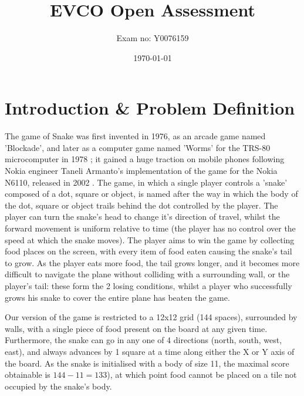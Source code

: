 \documentclass[british,10pt,a4paper]{article}
\begin{document}
\title{EVCO Open Assessment}
\author{Exam no: Y0076159}
\date{\today}
\maketitle
\tableofcontents
\clearpage
\listoffigures
\listoftables
\clearpage


\section{Introduction \& Problem Definition}

\begin{minipage}{0.7\textwidth}
The game of Snake was first invented in 1976, as an arcade game named 'Blockade', and later as a computer game named 'Worms' for the TRS-80 microcomputer in 1978 \cite{Goggin2010-ao}; it gained a huge traction on mobile phones following Nokia engineer Taneli Armanto's implementation of the game for the Nokia N6110, released in 2002 \cite{Goggin2010-ao}. The game, in which a single player controls a 'snake' composed of a dot, square or object, is named after the way in which the body of the dot, square or object trails behind the dot controlled by the player. The player can turn the snake's head to change it's direction of travel, whilst the forward movement is uniform relative to time (the player has no control over the speed at which the snake moves). The player aims to win the game by collecting food places on the screen, with every item of food eaten causing the snake's tail to grow. As the player eats more food, the tail grows longer, and it becomes more difficult to navigate the plane without colliding with a surrounding wall, or the player's tail: these form the 2 losing conditions, whilst a player who successfully grows his snake to cover the entire plane has beaten the game.  \newline

Our version of the game is restricted to a 12x12 grid (144 spaces), surrounded by walls, with a single piece of food present on the board at any given time. Furthermore, the snake can go in any one of 4 directions (north, south, west, east), and always advances by 1 square at a time along either the X or Y axis of the board. As the snake is initialised with a body of size 11, the maximal score obtainable is $144-11=133$), at which point food cannot be placed on a tile not occupied by the snake's body. 
\end{minipage}
\begin{minipage}{0.02\textwidth}
\end{minipage}
\end{document}

